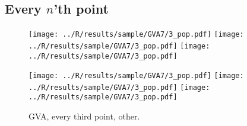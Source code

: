 \documentclass[a4paper]{article}
\begin{document}
\newpage
\subsection{Every $n$'th point}
\label{app:gva.sample}

\begin{figure}[!htbp]
\begin{center}
\texttt{[image: ../R/results/sample/GVA7/3\_pop.pdf]}
\texttt{[image: ../R/results/sample/GVA7/3\_pop.pdf]}
\texttt{[image: ../R/results/sample/GVA7/3\_pop.pdf]}
\end{center}
\end{figure}

\begin{figure}[!htbp]
\begin{center}
\texttt{[image: ../R/results/sample/GVA7/3\_pop.pdf]}
\texttt{[image: ../R/results/sample/GVA7/3\_pop.pdf]}
\texttt{[image: ../R/results/sample/GVA7/3\_pop.pdf]}
\caption{GVA, every third point, other.}
\end{center}
\end{figure}

\end{document}
